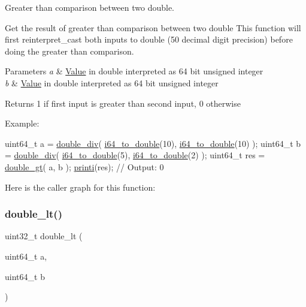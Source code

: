 Greater than comparison between two double. 

Get the result of greater than comparison between two double This function will first reinterpret\+\_\+cast both inputs to double (50 decimal digit precision) before doing the greater than comparison. 
\begin{DoxyParams}{Parameters}
{\em a} & \mbox{\hyperlink{struct_value}{Value}} in double interpreted as 64 bit unsigned integer \\
\hline
{\em b} & \mbox{\hyperlink{struct_value}{Value}} in double interpreted as 64 bit unsigned integer \\
\hline
\end{DoxyParams}
\begin{DoxyReturn}{Returns}
1 if first input is greater than second input, 0 otherwise
\end{DoxyReturn}
Example\+: 
\begin{DoxyCode}
uint64\_t a = \mbox{\hyperlink{group__mathcapi_gad67af06a6b0e9dbbf3be05d6bf99257c}{double\_div}}( \mbox{\hyperlink{group__mathcapi_gaec506d4ee77526e67ab5f2a8ef54f2b5}{i64\_to\_double}}(10), \mbox{\hyperlink{group__mathcapi_gaec506d4ee77526e67ab5f2a8ef54f2b5}{i64\_to\_double}}(10) );
uint64\_t b = \mbox{\hyperlink{group__mathcapi_gad67af06a6b0e9dbbf3be05d6bf99257c}{double\_div}}( \mbox{\hyperlink{group__mathcapi_gaec506d4ee77526e67ab5f2a8ef54f2b5}{i64\_to\_double}}(5), \mbox{\hyperlink{group__mathcapi_gaec506d4ee77526e67ab5f2a8ef54f2b5}{i64\_to\_double}}(2) );
uint64\_t res = \mbox{\hyperlink{group__mathcapi_gab60e3f0c6651ad497f6665e032e39f6a}{double\_gt}}( a, b );
\mbox{\hyperlink{group__consolecapi_gaac924af668edbf421d478edf203fdbd1}{printi}}(res); \textcolor{comment}{// Output: 0}
\end{DoxyCode}
 Here is the caller graph for this function\+:
\mbox{\label{group__mathcapi_ga68d359e670da751723bf3d78ff759614}} 
\subsubsection{\texorpdfstring{double\+\_\+lt()}{double\_lt()}}
{\footnotesize\ttfamily uint32\+\_\+t double\+\_\+lt (\begin{DoxyParamCaption}\item[{uint64\+\_\+t}]{a,  }\item[{uint64\+\_\+t}]{b }\end{DoxyParamCaption})}



